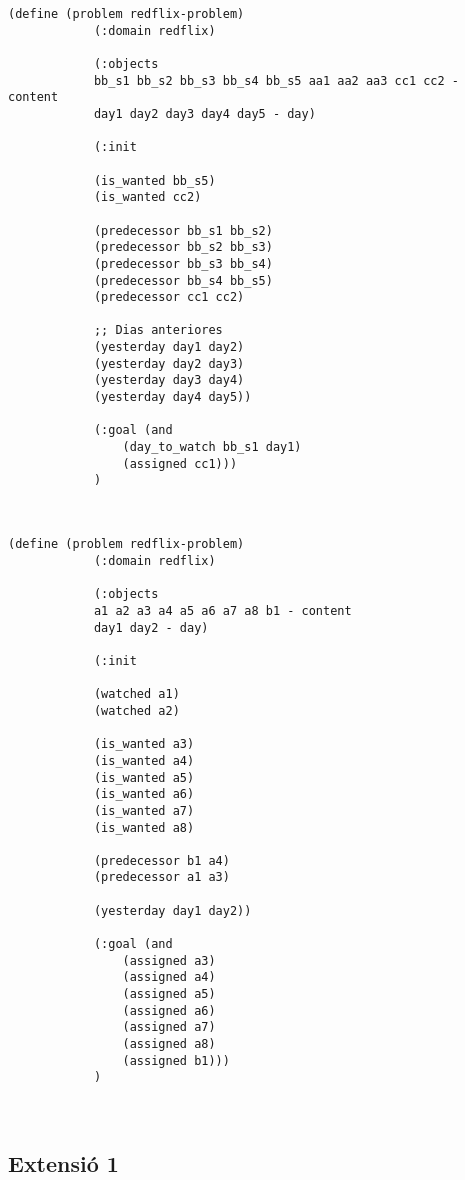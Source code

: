 \documentclass[a4paper]{article}
\begin{document}
	
	\noindent
	\begin{minipage}[t]{0.45\textwidth}
		\begin{lstlisting}[language=PDDL, caption={Joc de Prova 1 - Nivell Bàsic}, label={lst:JP1B}]                     
			(define (problem redflix-problem)
			(:domain redflix)
			
			(:objects
			bb_s1 bb_s2 bb_s3 bb_s4 bb_s5 aa1 aa2 aa3 cc1 cc2 - content
			day1 day2 day3 day4 day5 - day)
			
			(:init
			
			(is_wanted bb_s5)
			(is_wanted cc2)
			
			(predecessor bb_s1 bb_s2)
			(predecessor bb_s2 bb_s3)
			(predecessor bb_s3 bb_s4)
			(predecessor bb_s4 bb_s5)
			(predecessor cc1 cc2)
			
			;; Dias anteriores
			(yesterday day1 day2)
			(yesterday day2 day3)
			(yesterday day3 day4)
			(yesterday day4 day5))
			
			(:goal (and
				(day_to_watch bb_s1 day1)
				(assigned cc1)))
			)
			
			
		\end{lstlisting}
		
	\end{minipage}
	\hfill
	\begin{minipage}[t]{0.45\textwidth}
		\begin{lstlisting}[language=PDDL, caption={Joc de Prova 2 - Nivell Bàsic}, label={lst:JP2B}]                     
		(define (problem redflix-problem)
			(:domain redflix)
			
			(:objects
			a1 a2 a3 a4 a5 a6 a7 a8 b1 - content
			day1 day2 - day)
			
			(:init

			(watched a1)
			(watched a2)

			(is_wanted a3)
			(is_wanted a4)
			(is_wanted a5)
			(is_wanted a6)
			(is_wanted a7)
			(is_wanted a8)
			
			(predecessor b1 a4)
			(predecessor a1 a3)
			
			(yesterday day1 day2))
			
			(:goal (and
				(assigned a3)
				(assigned a4)
				(assigned a5)
				(assigned a6)
				(assigned a7)   
				(assigned a8)
				(assigned b1)))
			)
			
			
		\end{lstlisting}
	\end{minipage}
	
	
	\subsection{Extensió 1}
	
\end{document}
